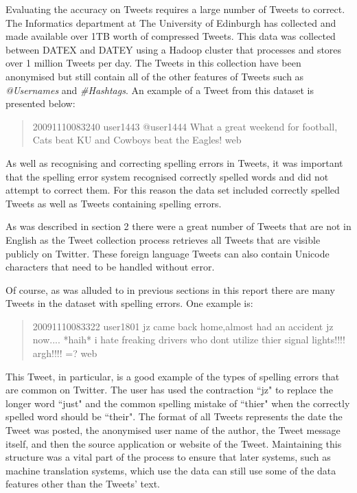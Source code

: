Evaluating the accuracy on Tweets requires a large number of Tweets to correct. The Informatics department at The University of Edinburgh has collected and made available over 1TB worth of compressed Tweets\cite{}. This data was collected between DATEX and DATEY using a Hadoop cluster \cite{} that processes and stores over 1 million Tweets per day. The Tweets in this collection have been anonymised but still contain all of the other features of Tweets such as \emph{@Usernames} and \emph{#Hashtags}. An example of a Tweet from this dataset is presented below:

\begin{quote}
20091110083240 user1443 @user1444 What a great weekend for football, Cats beat KU and Cowboys beat the Eagles! web
\end{quote}

As well as recognising and correcting spelling errors in Tweets, it was important that the spelling error system recognised correctly spelled words and did not attempt to correct them. For this reason the data set included correctly spelled Tweets as well as Tweets containing spelling errors.

As was described in section 2 there were a great number of Tweets that are not in English as the Tweet collection process retrieves all Tweets that are visible publicly on Twitter. These foreign language Tweets can also contain Unicode characters that need to be handled without error.

Of course, as was alluded to in previous sections in this report there are many Tweets in the dataset with spelling errors. One example is:

\begin{quote}
20091110083322 user1801 jz came back home,almost had an accident jz now.... *haih* i hate freaking drivers who dont utilize thier signal lights!!!! argh!!!! =? web
\end{quote}

This Tweet, in particular, is a good example of the types of spelling errors that are common on Twitter. The user has used the contraction ``jz" to replace the longer word ``just" and the common spelling mistake of ``thier" when the correctly spelled word should be ``their". The format of all Tweets represents the date the Tweet was posted, the anonymised user name of the author, the Tweet message itself, and then the source application or website of the Tweet. Maintaining this structure was a vital part of the process to ensure that later systems, such as machine translation systems, which use the data can still use some of the data features other than the Tweets' text.

